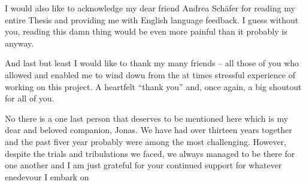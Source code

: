I would also like to acknowledge my dear friend Andrea Schäfer for reading my entire Thesis and providing me with English language feedback. I guess without you, reading this damn thing would be even more painful than it probably is anyway.

And last but least I would like to thank my many friends -- all those of you who allowed and enabled me to wind down from the at times stressful experience of working on this project. A heartfelt ``thank you'' and, once again, a big shoutout for all of you.

No there is a one last person that deserves to be mentioned here which is my dear and beloved companion, Jonas. We have had over thirteen years together and the past fiver year probably were among the most challenging. However, despite the trials and tribulations we faced, we always managed to be there for one another and I am just grateful for your continued support for whatever enedevour I embark on


\cleardoublepage
